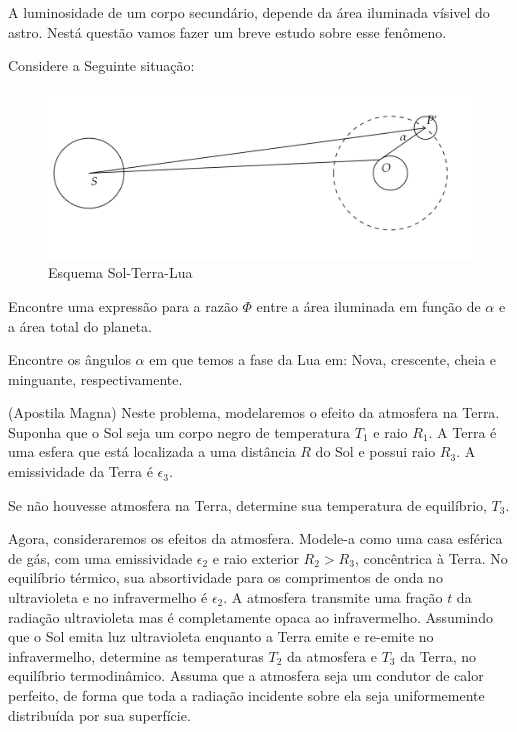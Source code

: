 \documentclass[11pt]{article}
\begin{document}
\begin{pproblem}
    A luminosidade de um corpo secundário, depende da área iluminada vísivel do astro. Nestá questão vamos fazer um breve estudo sobre esse fenômeno.
    \begin{alternativas}
        \item  Considere a Seguinte situação:
        \begin{figure}[H]
            \centering
            \includegraphics[width=0.8\linewidth]{imagens/fotometria 1.png}
            \caption{Esquema Sol-Terra-Lua}
        \end{figure}

        Encontre uma expressão para a razão \(\Phi\) entre a área iluminada em função de \(\alpha\) e a área total do planeta.
        
        \item Encontre os ângulos \(\alpha\) em que temos a fase da Lua em: Nova, crescente, cheia e minguante, respectivamente.
    \end{alternativas}


\end{pproblem}

\begin{pproblem} (Apostila Magna)
    Neste problema, modelaremos o efeito da atmosfera na Terra. Suponha que o Sol
seja um corpo negro de temperatura \(T_1\) e raio \(R_1\). A Terra é uma esfera que está localizada
a uma distância \(R\) do Sol e possui raio \(R_3\). A emissividade da Terra é \(\epsilon_3\).
\begin{alternativas}
    \item Se não houvesse atmosfera na Terra, determine sua temperatura de equilíbrio, \(T_3\).
    \item  Agora, consideraremos os efeitos da atmosfera. Modele-a como uma casa esférica de gás,
    com uma emissividade \(\epsilon_2\) e raio exterior \(R_2>R_3\), concêntrica à Terra. No equilíbrio térmico,
    sua absortividade para os comprimentos de onda no ultravioleta e no infravermelho é \(\epsilon_2\). A
    atmosfera transmite uma fração \(t\) da radiação ultravioleta mas é completamente opaca ao
    infravermelho. Assumindo que o Sol emita luz ultravioleta enquanto a Terra emite e re-emite
    no infravermelho, determine as temperaturas \(T_2\) da atmosfera e \(T_3\) da Terra, no equilíbrio
    termodinâmico. Assuma que a atmosfera seja um condutor de calor perfeito, de forma que
    toda a radiação incidente sobre ela seja uniformemente distribuída por sua superfície.
\end{alternativas}


\end{pproblem}
\end{document}
